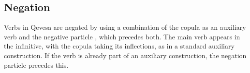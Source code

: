 \documentclass[grammar]{subfiles}
\begin{document}
  \subsection{Negation}
  \label{ssec:vm_negation}

  Verbs in Qevesa are negated by using a combination of the copula as an
  auxiliary verb and the negative particle , which precedes both.
  The main verb appears in the infinitive, with the copula taking its
  inflections, as in a standard auxiliary construction.  If the verb is already
  part of an auxiliary construction, the negation particle precedes this. 











\end{document}
